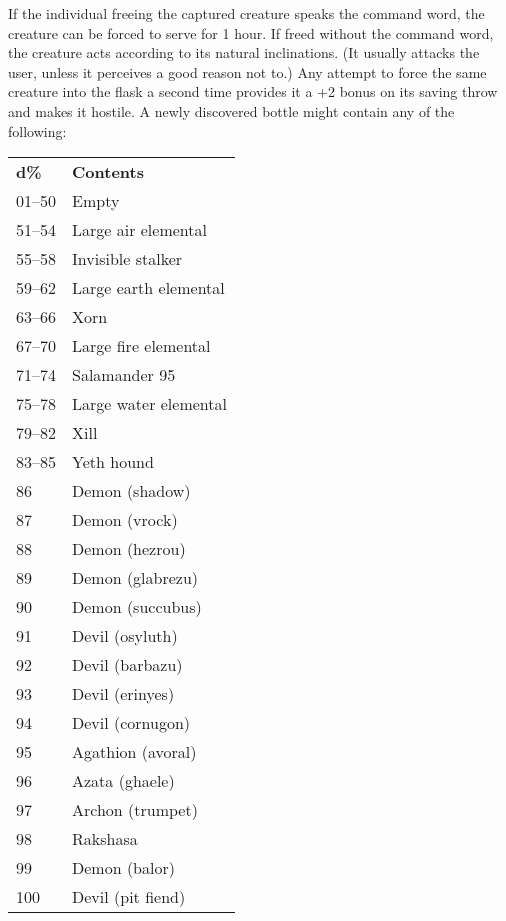 If the individual freeing the captured creature speaks the command word, the creature can be forced to serve for 1 hour. If freed without the command word, the creature acts according to its natural inclinations. (It usually attacks the user, unless it perceives a good reason not to.) Any attempt to force the same creature into the flask a second time provides it a +2 bonus on its saving throw and makes it hostile. A newly discovered bottle might contain any of the following:
\begin{tabular}{ll}
\textbf{d\%} & \textbf{Contents}     \\
01–50        & Empty                 \\
51–54        & Large air elemental   \\
55–58        & Invisible stalker     \\
59–62        & Large earth elemental \\
63–66        & Xorn                  \\
67–70        & Large fire elemental  \\
71–74        & Salamander 95         \\
75–78        & Large water elemental \\
79–82        & Xill                  \\
83–85        & Yeth hound            \\
86           & Demon (shadow)        \\
87           & Demon (vrock)         \\
88           & Demon (hezrou)        \\
89           & Demon (glabrezu)      \\
90           & Demon (succubus)      \\
91           & Devil (osyluth)       \\
92           & Devil (barbazu)       \\
93           & Devil (erinyes)       \\
94           & Devil (cornugon)      \\
95           & Agathion (avoral)     \\
96           & Azata (ghaele)        \\
97           & Archon (trumpet)      \\
98           & Rakshasa              \\
99           & Demon (balor)         \\
100          & Devil (pit fiend)    
\end{tabular} 
				
